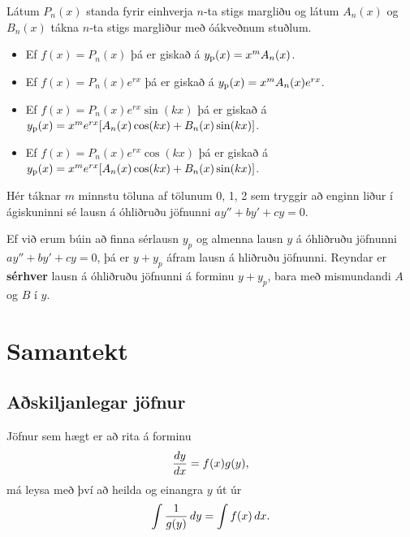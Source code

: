 \documentclass[b5paper,10pt,icelandic]{sphinxmanual}
\begin{document}
Látum \(P_n(x)\) standa fyrir einhverja \(n\)-ta stigs margliðu
og látum \(A_n(x)\) og \(B_n(x)\) tákna \(n\)-ta stigs
margliður með óákveðnum stuðlum.
\begin{itemize}
\item {} 
Ef \(f(x)=P_n(x)\) þá er giskað á \(y_{\rm p}(x)=x^mA_n(x)\).

\item {} 
Ef \(f(x)=P_n(x)e^{rx}\) þá er giskað á
\(y_{\rm p}(x)=x^mA_n(x)e^{rx}\).

\item {} 
Ef \(f(x)=P_n(x)e^{rx}\sin(kx)\) þá er giskað á
\(y_{\rm p}(x)=x^me^{rx}[A_n(x)\cos(kx)+B_n(x)\sin(kx)]\).

\item {} 
Ef \(f(x)=P_n(x)e^{rx}\cos(kx)\) þá er giskað á
\(y_{\rm p}(x)=x^me^{rx}[A_n(x)\cos(kx)+B_n(x)\sin(kx)]\).

\end{itemize}

Hér táknar \(m\) minnstu töluna af tölunum 0, 1, 2 sem tryggir að
enginn liður í ágiskuninni sé lausn á óhliðruðu jöfnunni
\(ay''+by'+cy=0\).

Ef við erum búin að finna sérlausn \(y_p\) og almenna lausn
\(y\) á óhliðruðu jöfnunni \(ay''+by'+cy=0\), þá er
\(y+y_p\) áfram lausn á hliðruðu jöfnunni. Reyndar er \textbf{sérhver}
lausn á óhliðruðu jöfnunni á forminu \(y+y_p\), bara
með mismundandi \(A\) og \(B\) í \(y\).


\section{Samantekt}
\label{kafli08:index-8}\label{kafli08:samantekt}

\subsection{Aðskiljanlegar jöfnur}
\label{kafli08:askiljanlegar-jofnur}
Jöfnur sem hægt er að rita á forminu
\begin{gather}
\begin{split}\frac{dy}{dx} = f(x)g(y),\end{split}\notag
\end{gather}
má leysa með því að heilda og einangra \(y\) út úr
\begin{gather}
\begin{split}\int \frac 1{g(y)}\, dy = \int f(x)\, dx.\end{split}\notag
\end{gather}
\end{document}
